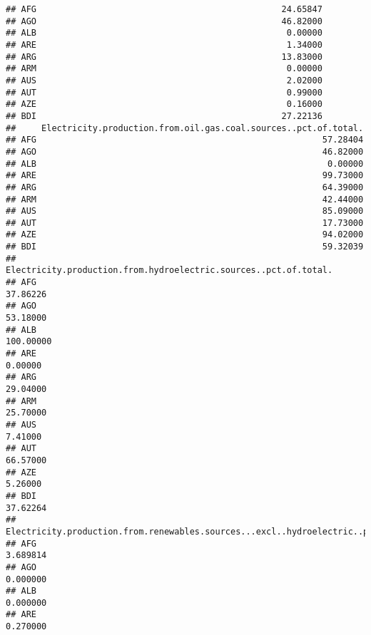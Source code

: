 \documentclass[]{article}
\begin{document}
\begin{verbatim}
## AFG                                                24.65847
## AGO                                                46.82000
## ALB                                                 0.00000
## ARE                                                 1.34000
## ARG                                                13.83000
## ARM                                                 0.00000
## AUS                                                 2.02000
## AUT                                                 0.99000
## AZE                                                 0.16000
## BDI                                                27.22136
##     Electricity.production.from.oil.gas.coal.sources..pct.of.total.
## AFG                                                        57.28404
## AGO                                                        46.82000
## ALB                                                         0.00000
## ARE                                                        99.73000
## ARG                                                        64.39000
## ARM                                                        42.44000
## AUS                                                        85.09000
## AUT                                                        17.73000
## AZE                                                        94.02000
## BDI                                                        59.32039
##     Electricity.production.from.hydroelectric.sources..pct.of.total.
## AFG                                                         37.86226
## AGO                                                         53.18000
## ALB                                                        100.00000
## ARE                                                          0.00000
## ARG                                                         29.04000
## ARM                                                         25.70000
## AUS                                                          7.41000
## AUT                                                         66.57000
## AZE                                                          5.26000
## BDI                                                         37.62264
##     Electricity.production.from.renewables.sources...excl..hydroelectric..pct.of.total.
## AFG                                                                            3.689814
## AGO                                                                            0.000000
## ALB                                                                            0.000000
## ARE                                                                            0.270000

\end{verbatim}
\end{document}
